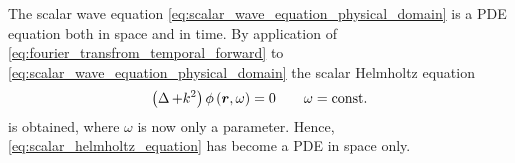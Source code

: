 The scalar wave equation \eqref{eq:scalar_wave_equation_physical_domain}
is a \ac{PDE} equation both in space and in time.
By application of \eqref{eq:fourier_transfrom_temporal_forward} to
\eqref{eq:scalar_wave_equation_physical_domain} the scalar Helmholtz equation
\begin{equation}\label{eq:scalar_helmholtz_equation}
	\left( \laplace + k^2 \right) \phi \left( \robs, \omega \right) = 0
	\qquad \omega = \mathrm{const.}
\end{equation}
is obtained, where $\omega$ is now only a parameter.
Hence, \eqref{eq:scalar_helmholtz_equation} has become a \ac{PDE} in space only.











